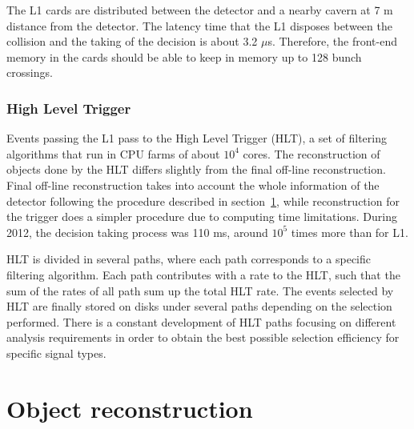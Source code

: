 The L1 cards are distributed between the detector and a nearby cavern at 7 m distance from the detector. The latency time that the L1 disposes between the collision and the taking of the decision is about 3.2 $\mu$s. Therefore, the front-end memory in the cards should be able to keep in memory up to 128 bunch crossings. 

\subsubsection{High Level Trigger}
\label{sec:HLT}


Events passing the L1 pass to the High Level Trigger (HLT), a set of filtering algorithms that run in CPU farms of about $10^{4}$ cores. The reconstruction of objects done by the HLT differs slightly from the final off-line reconstruction. Final off-line reconstruction takes into account the whole information of the detector following the procedure described in section~\ref{sec:reco}, while reconstruction for the trigger does a simpler procedure due to computing time limitations. During 2012, the decision taking process was 110 ms, around $10^{5}$ times more than for L1.

HLT is divided in several paths, where each path corresponds to a specific filtering algorithm. Each path contributes with a rate to the HLT, such that the sum of the rates of all path sum up the total HLT rate. The events selected by HLT are finally stored on disks under several paths depending on the selection performed. There is a constant development of HLT paths focusing on different analysis requirements in order to obtain the best possible selection efficiency for specific signal types. 

\section{Object reconstruction}
\label{sec:reco}

